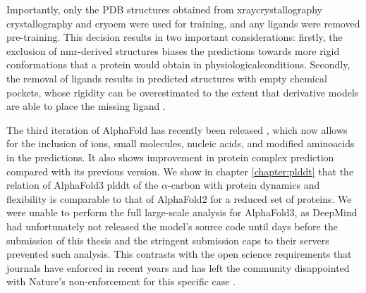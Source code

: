 Importantly, only the PDB structures obtained from \gls{xraycrystallography} crystallography and \gls{cryoem} were used for training, and any \glspl{ligand} were removed pre-training. This decision results in two important considerations: firstly, the exclusion of \gls{nmr}-derived structures biases the predictions towards more rigid \glspl{conformation} that a protein would obtain in \gls{physiologicalconditions}. Secondly, the removal of \glspl{ligand} results in predicted structures with empty chemical pockets, whose rigidity can be overestimated to the extent that derivative models are able to place the missing \gls{ligand} \cite{hekkelman_alphafill_2023}.

The third iteration of AlphaFold has recently been released \cite{abramson_accurate_2024}, which now allows for the inclusion of ions, small molecules, nucleic acids, and modified \glspl{aminoacid} in the predictions. It also shows improvement in protein complex prediction compared with its previous version. We show in chapter \ref{chapter:plddt} that the relation of AlphaFold3 \gls{plddt} of the $\alpha\text{-carbon}$ with protein \gls{dynamics} and \gls{flexibility} is comparable to that of AlphaFold2 for a reduced set of proteins. We were unable to perform the full large-scale analysis for AlphaFold3, as DeepMind had unfortunately not released the model's source code \cite{noauthor_alphafold3_2024} until days before the submission of this thesis \cite{callaway_ai_2024} and the stringent submission caps to their servers prevented such analysis. This contrasts with the open science requirements that journals have enforced in recent years and has left the community disappointed with Nature's non-enforcement for this specific case \cite{lin_alphafold_2024, wankowicz_alphafold3_2024}.


